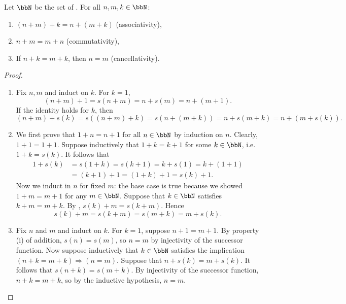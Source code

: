 \begin{proposition} \label{proposition:natural_numbers_addition_associative_commutative}
Let $\bbN$ be the set of . For all $n, m, k \in \bbN$:
\begin{enumerate}
    \item $(n + m) + k = n + (m + k)$ (associativity),
    \item $n + m = m + n$ (commutativity),
    \item If $n + k = m + k$, then $n = m$ (cancellativity).
\end{enumerate}
\end{proposition}

\begin{proof}
    \begin{enumerate}
        \item Fix $n, m$ and induct on $k$. For $k = 1$, 
        $$(n + m) + 1 = s(n + m) = n + s(m) = n + (m + 1).$$ 
        If the identity holds for $k$, then 
        $$(n + m) + s(k) = s((n + m) + k) = s(n + (m + k)) = n + s(m + k) = n + (m + s(k)).$$

        \item We first prove that $1+n = n+1$ for all $n \in \bbN$ by induction on $n$. Clearly, $1+1 = 1+1$. Suppose inductively that $1+k = k+1$ for some $k \in \bbN$, i.e. $1+k = s(k)$. It follows that 
        \begin{align*}
        1+s(k) &= s(1+k) = s(k+1) = k + s(1) = k + (1+1) \\
        &= (k+1) +1 = (1+k) +1 = s(k) +1.
        \end{align*}
        Now we induct in $n$ for fixed $m$: the base case is true because we showed $1+m = m+1$ for any $m \in \bbN$. Suppose that $k \in \bbN$ satisfies $k+m = m+k$. By , $s(k)+m = s(k+m)$. Hence
        $$s(k) + m = s(k+m) = s(m+k) = m + s(k).$$

        \item Fix $n$ and $m$ and induct on $k$. For $k=1$, suppose $n+1 = m+1$. By property (i) of addition, $s(n) = s(m)$, so $n=m$ by injectivity of the successor function. Now suppose inductively that $k \in \bbN$ satisfies the implication $(n+k = m+k)  \Rightarrow (n = m)$. Suppose that $n+s(k) = m+s(k)$. It follows that $s(n+k) = s(m+k)$. By injectivity of the successor function, $n+k = m+k$, so by the inductive hypothesis, $n=m$.
    \end{enumerate}

\end{proof}

